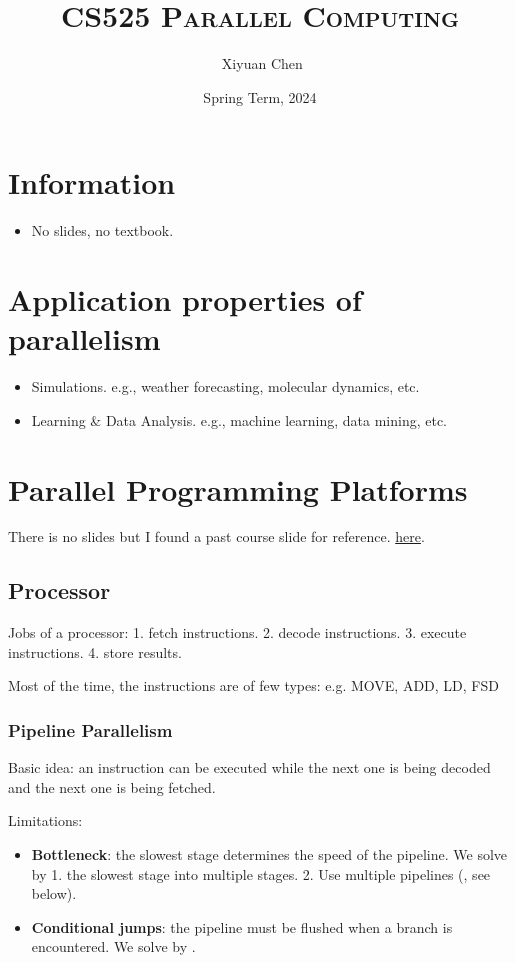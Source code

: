 \documentclass{../../ainote}
\author{\ccLogo \,\,Xiyuan Chen}
\title{\textsc{CS525 Parallel Computing}}
\date{Spring Term, 2024}
\begin{document}
\maketitle
\doclicenseThis
\section*{Information}
\begin{itemize}
	\item No slides, no textbook.
\end{itemize}
\tableofcontents
\newpage

\section{Application properties of parallelism}
\begin{itemize}
    \item Simulations. e.g., weather forecasting, molecular dynamics, etc.
    \item Learning \& Data Analysis. e.g., machine learning, data mining, etc.
\end{itemize}

\section{Parallel Programming Platforms}
There is no slides but I found a past course slide for reference. \href{https://www.cs.purdue.edu/homes/ayg/CS525_SPR17/chap2_slides.pdf}{here}.

\subsection{Processor}
Jobs of a processor: 1. fetch instructions. 2. decode instructions. 3. execute instructions. 4. store results.

Most of the time, the instructions are of few types: e.g. MOVE, ADD, LD, FSD

\subsubsection{Pipeline Parallelism}
Basic idea: an instruction can be executed while the next one is being decoded and the next one is being fetched.

Limitations: 
\begin{itemize}
    \item \textbf{Bottleneck}: the slowest stage determines the speed of the pipeline. We solve by 1.  the slowest stage into multiple stages. 2. Use multiple pipelines (, see below).
    \item \textbf{Conditional jumps}: the pipeline must be flushed when a branch is encountered. We solve by .
\end{itemize}
\end{document}
